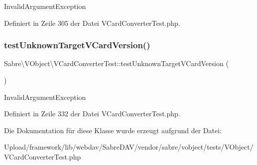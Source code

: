 Invalid\+Argument\+Exception 

Definiert in Zeile 305 der Datei V\+Card\+Converter\+Test.\+php.

\mbox{\label{class_sabre_1_1_v_object_1_1_v_card_converter_test_aa42bb1c279ce09c3e3748c7d2915fe61}} 
\subsubsection{\texorpdfstring{test\+Unknown\+Target\+V\+Card\+Version()}{testUnknownTargetVCardVersion()}}
{\footnotesize\ttfamily Sabre\textbackslash{}\+V\+Object\textbackslash{}\+V\+Card\+Converter\+Test\+::test\+Unknown\+Target\+V\+Card\+Version (\begin{DoxyParamCaption}{ }\end{DoxyParamCaption})}

Invalid\+Argument\+Exception 

Definiert in Zeile 332 der Datei V\+Card\+Converter\+Test.\+php.



Die Dokumentation für diese Klasse wurde erzeugt aufgrund der Datei\+:\begin{DoxyCompactItemize}
\item 
Upload/framework/lib/webdav/\+Sabre\+D\+A\+V/vendor/sabre/vobject/tests/\+V\+Object/V\+Card\+Converter\+Test.\+php\end{DoxyCompactItemize}
